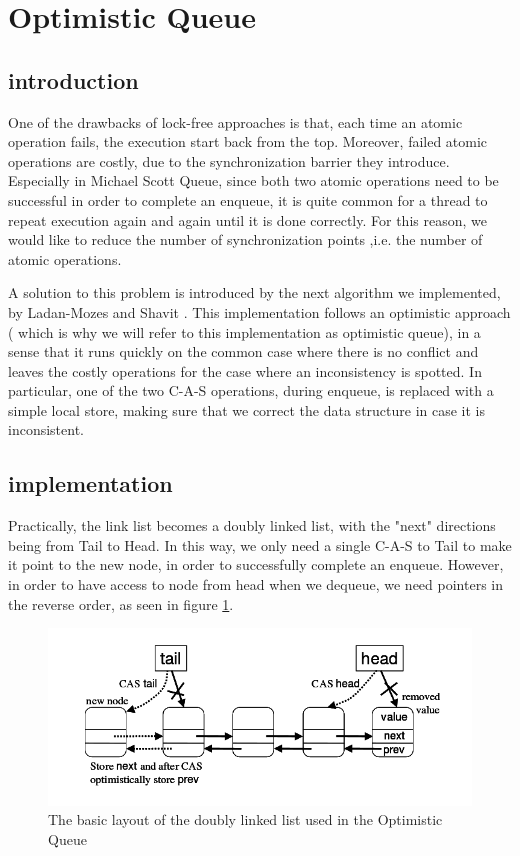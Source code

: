 \section{Optimistic Queue}

\subsection{introduction}
One of the drawbacks of lock-free approaches is that, each time an atomic operation fails, the execution start back from the top. Moreover, failed atomic operations are costly, due to the synchronization barrier they introduce. Especially in Michael Scott Queue, since both two atomic operations need to be successful in order to complete an enqueue, it is quite common for a thread to repeat execution again and again until it is done correctly. For this reason, we would like to reduce the number of synchronization points ,i.e. the number of atomic operations.

A solution to this problem is introduced by the next algorithm we implemented, by Ladan-Mozes and Shavit \cite{optimistic}. This implementation follows an optimistic approach ( which is why we will refer to this implementation as optimistic queue), in a sense that it runs quickly on the common case where there is no conflict and leaves the costly operations for the case where an inconsistency is spotted. In particular, one of the two C-A-S operations, during enqueue, is replaced with a simple local store, making sure that we correct the data structure in case it is inconsistent.

\subsection{implementation}
Practically, the link list becomes a doubly linked list, with the "next" directions being from Tail to Head. In this way, we only need a single C-A-S to Tail to make it point to the new node, in order to successfully complete an enqueue. However, in order to have access to node from head when we dequeue, we need pointers in the reverse order, as seen in figure \ref{optimistic_struct}.

\begin{figure}
 \centering
  \includegraphics[scale=0.6]{optimistic_struct.png}
 \caption{ The basic layout of the doubly linked list used in the Optimistic Queue}
\label{optimistic_struct}
\end{figure}

